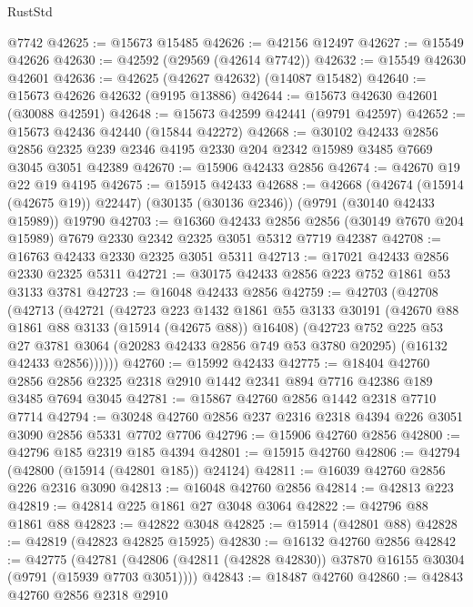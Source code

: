 \begin{lexlean}{RustStd}
\begin{coremodule}
    @7742
@42625 := @15673 @15485
@42626 := @42156 @12497
@42627 := @15549 @42626
@42630 := @42592 (@29569 (@42614 @7742))
@42632 := @15549 @42630 @42601
@42636 := @42625 (@42627 @42632) (@14087 @15482)
@42640 := @15673 @42626 @42632 (@9195 @13886)
@42644 := @15673 @42630 @42601 (@30088 @42591)
@42648 := @15673 @42599 @42441 (@9791 @42597)
@42652 := @15673 @42436 @42440 (@15844 @42272)
@42668 := @30102
    @42433
    @2856
    @2856
    @2325
    @239
    @2346
    @4195
    @2330
    @204
    @2342
    @15989
    @3485
    @7669
    @3045
    @3051
    @42389
@42670 := @15906 @42433 @2856
@42674 := @42670 @19 @22 @19 @4195
@42675 := @15915 @42433
@42688 := @42668
    (@42674 (@15914 (@42675 @19)) @22447)
    (@30135 (@30136 @2346))
    (@9791 (@30140 @42433 @15989))
    @19790
@42703 := @16360
    @42433
    @2856
    @2856
    (@30149 @7670 @204 @15989)
    @7679
    @2330
    @2342
    @2325
    @3051
    @5312
    @7719
    @42387
@42708 := @16763 @42433 @2330 @2325 @3051 @5311
@42713 := @17021 @42433 @2856 @2330 @2325 @5311
@42721 := @30175 @42433 @2856 @223 @752 @1861 @53 @3133 @3781
@42723 := @16048 @42433 @2856
@42759 := @42703
    (@42708
      (@42713
        (@42721
          (@42723
            @223
            @1432
            @1861
            @55
            @3133
            @30191
            (@42670 @88 @1861 @88 @3133 (@15914 (@42675 @88)) @16408)
            (@42723
              @752
              @225
              @53
              @27
              @3781
              @3064
              (@20283 @42433 @2856 @749 @53 @3780 @20295)
              (@16132 @42433 @2856))))))
@42760 := @15992 @42433
@42775 := @18404
    @42760
    @2856
    @2856
    @2325
    @2318
    @2910
    @1442
    @2341
    @894
    @7716
    @42386
    @189
    @3485
    @7694
    @3045
@42781 := @15867 @42760 @2856 @1442 @2318 @7710 @7714
@42794 := @30248 @42760 @2856 @237 @2316 @2318 @4394 @226 @3051 @3090 @2856 @5331 @7702 @7706
@42796 := @15906 @42760 @2856
@42800 := @42796 @185 @2319 @185 @4394
@42801 := @15915 @42760
@42806 := @42794 (@42800 (@15914 (@42801 @185)) @24124)
@42811 := @16039 @42760 @2856 @226 @2316 @3090
@42813 := @16048 @42760 @2856
@42814 := @42813 @223
@42819 := @42814 @225 @1861 @27 @3048 @3064
@42822 := @42796 @88 @1861 @88
@42823 := @42822 @3048
@42825 := @15914 (@42801 @88)
@42828 := @42819 (@42823 @42825 @15925)
@42830 := @16132 @42760 @2856
@42842 := @42775
    (@42781 (@42806 (@42811 (@42828 @42830)) @37870 @16155 @30304 (@9791 (@15939 @7703 @3051))))
@42843 := @18487 @42760
@42860 := @42843
    @42760
    @2856
    @2318
    @2910

\end{coremodule}
\end{lexlean}
